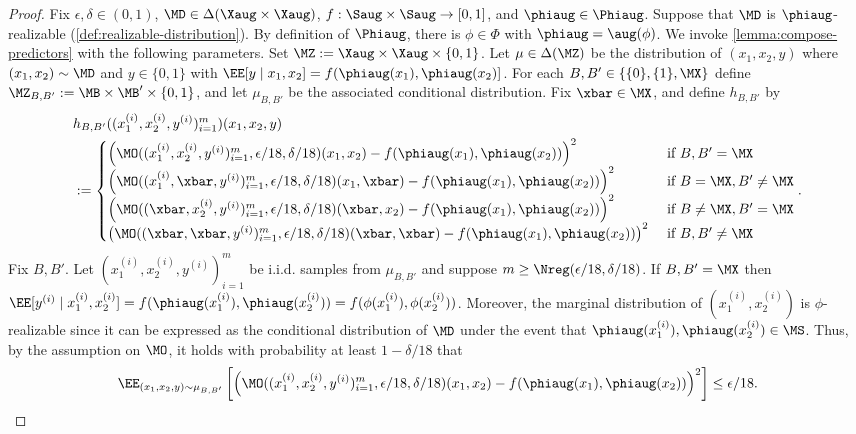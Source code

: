 \begin{proof}
Fix $\epsilon,\delta \in (0,1)$, $\MD \in \Delta(\Xaug\times\Xaug)$, $f: \Saug\times\Saug \to [0,1]$, and $\phiaug\in\Phiaug$. Suppose that $\MD$ is $\phiaug$-realizable (\cref{def:realizable-distribution}). By definition of $\Phiaug$, there is $\phi\in\Phi$ with $\phiaug = \aug(\phi)$. We invoke \cref{lemma:compose-predictors} with the following parameters. Set $\MZ := \Xaug \times\Xaug \times \{0,1\}$. Let $\mu \in \Delta(\MZ)$ be the distribution of $(x_1,x_2,y)$ where $(x_1,x_2) \sim \MD$ and $y \in \{0,1\}$ with $\EE[y\mid{}x_1,x_2] = f(\phiaug(x_1),\phiaug(x_2)]$. For each $B,B' \in \{\{0\},\{1\},\MX\}$ define $\MZ_{B,B'} := \MB\times\MB'\times \{0,1\}$, and let $\mu_{B,B'}$ be the associated conditional distribution. Fix $\xbar \in \MX$, and define $h_{B,B'}$ by
\begin{align*}
&h_{B,B'}((x_1^{(i)},x_2^{(i)},y^{(i)})_{i=1}^m)(x_1,x_2,y) \\ 
&:= \begin{cases}
\left(\MO((x_1^{(i)},x_2^{(i)},y^{(i)})_{i=1}^m,\epsilon/18,\delta/18)(x_1,x_2) - f(\phiaug(x_1),\phiaug(x_2))\right)^2 & \text{ if } B,B' = \MX \\ 
\left(\MO((x_1^{(i)},\xbar,y^{(i)})_{i=1}^m,\epsilon/18,\delta/18)(x_1,\xbar) - f(\phiaug(x_1),\phiaug(x_2))\right)^2 & \text{ if } B = \MX, B' \neq \MX \\
\left(\MO((\xbar,x_2^{(i)},y^{(i)})_{i=1}^m,\epsilon/18,\delta/18)(\xbar,x_2) - f(\phiaug(x_1),\phiaug(x_2))\right)^2 & \text{ if } B \neq \MX, B' = \MX \\
\left(\MO((\xbar,\xbar,y^{(i)})_{i=1}^m,\epsilon/18,\delta/18)(\xbar,\xbar) - f(\phiaug(x_1),\phiaug(x_2))\right)^2 & \text{ if } B,B' \neq \MX
\end{cases}.
\end{align*}
Fix $B,B'$. Let $(x_1^{(i)},x_2^{(i)},y^{(i)})_{i=1}^m$ be i.i.d. samples from $\mu_{B,B'}$ and suppose $m \geq \Nreg(\epsilon/18,\delta/18)$. If $B,B'=\MX$ then $\EE[y^{(i)}\mid{}x_1^{(i)},x_2^{(i)}] = f(\phiaug(x_1^{(i)}),\phiaug(x_2^{(i)})) = f(\phi(x_1^{(i)}),\phi(x_2^{(i)}))$. Moreover, the marginal distribution of $(x_1^{(i)},x_2^{(i)})$ is $\phi$-realizable since it can be expressed as the conditional distribution of $\MD$ under the event that $\phiaug(x_1^{(i)}),\phiaug(x_2^{(i)}) \in \MS$. Thus, by the assumption on $\MO$, it holds with probability at least $1-\delta/18$ that
\[\EE_{(x_1,x_2,y)\sim\mu_{B,B'}}\left[\left(\MO((x_1^{(i)},x_2^{(i)},y^{(i)})_{i=1}^m,\epsilon/18,\delta/18)(x_1,x_2) - f(\phiaug(x_1),\phiaug(x_2))\right)^2 \right] \leq \epsilon/18.\]

\end{proof}
